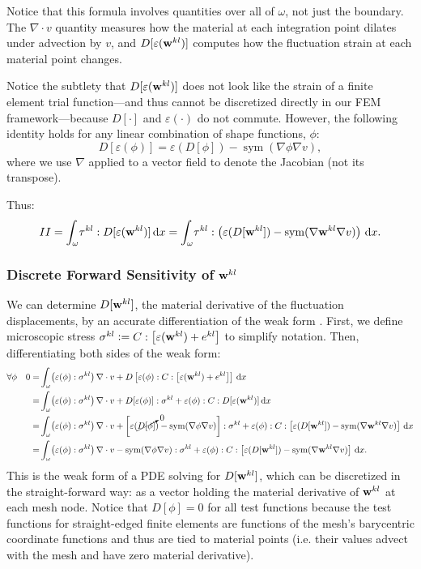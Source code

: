 \documentclass[10pt]{article}
\renewcommand{\div}{\nabla \cdot}
\providecommand{\shape}{\omega}
\providecommand{\vint}[3][x]{\int_{#2} \! #3 \, \mathrm{d}#1}
\renewcommand{\vec}[1]{{\bf #1}}
\newcommand\pr[1]{\prettyref{#1}}
\def\w{\vec{w}}
\def\strain{\varepsilon}
\DeclareMathOperator*{\sym}{sym}
\newcommand{\defeq}{\vcentcolon=}
\begin{document}
Notice that this formula involves quantities over all of $\omega$, not just the boundary.
The $\div v$ quantity measures how the material at each integration point
dilates under advection by $v$, and $D[\strain(\w^{kl})]$ computes how the
fluctuation strain at each material point changes.

Notice the subtlety that $D[\strain(\w^{kl})]$ does not look like the strain of
a finite element trial function---and thus cannot be discretized directly in
our FEM framework---because $D[\cdot]$ and $\strain(\cdot)$ do not commute.
However, the following identity holds for any linear combination of shape
functions, $\phi$:
$$
D[\strain(\phi)] = \strain(D[\phi]) - \sym(\nabla \phi \nabla v),
$$
where we use $\nabla$ applied to a vector field to denote the Jacobian (not its
transpose).

Thus:
$$
II = \vint{\shape}{\tau^{kl} : D[\strain(\w^{kl})]}
   = \vint{\shape}{\tau^{kl} : \left(\strain(D[\w^{kl}]) - \sym(\nabla \w^{kl} \nabla v) \right)}.
$$
\subsubsection{Discrete Forward Sensitivity of \texorpdfstring{$\w^{kl}$}{w\textasciicircum kl}}
We can determine $D[\w^{kl}]$, the material derivative of the fluctuation
displacements, by an accurate differentiation of the weak form
\pr{eqn:weak_cell}. First, we define microscopic stress $\sigma^{kl} \defeq C :
\left[\strain(\w^{kl}) + e^{kl}\right]$ to simplify notation. Then,
differentiating both sides of the weak form:
\begin{align}
    \notag
\forall \phi \quad 0
   = &
    \vint{\shape}{\left(\strain(\phi) : \sigma^{kl} \right) \div v +
             D\left[\strain(\phi) : C : \left[\strain(\w^{kl}) + e^{kl}\right] \right]}
\notag
\\ = &
    \vint{\shape}{\left(\strain(\phi) : \sigma^{kl} \right) \div v +
             D[\strain(\phi)] : \sigma^{kl}  +
             \strain(\phi) : C : D[\strain(\w^{kl})]}
\notag
\\ = &
    \vint{\shape}{\left(\strain(\phi) : \sigma^{kl} \right) \div v
    + \left[\strain(\cancelto{0}{D[\phi]}) - \sym(\nabla \phi \nabla v)\right] : \sigma^{kl} 
    + \strain(\phi) : C : \left[\strain(D[\w^{kl}]) - \sym(\nabla \w^{kl} \nabla v)\right]}
\notag
\\ = &
    \vint{\shape}{\left(\strain(\phi) : \sigma^{kl} \right) \div v
    -  \sym(\nabla \phi \nabla v) : \sigma^{kl} 
    + \strain(\phi) : C : \left[\strain(D[\w^{kl}]) - \sym(\nabla \w^{kl} \nabla v)\right]}
.
\label{eqn:discretizable_weak_diff}
\end{align}
This is the weak form of a PDE solving for $D[\w^{kl}]$, which can be
discretized in the straight-forward way: as a vector holding the material
derivative of $\w^{kl}$ at each mesh node. Notice that $D[\phi] = 0$ for all
test functions because the test functions for straight-edged finite elements
are functions of the mesh's barycentric coordinate functions and thus are tied
to material points (i.e. their values advect with the mesh and have zero
material derivative).
\end{document}
